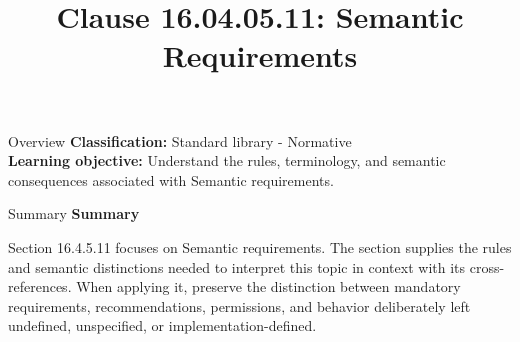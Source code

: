 \documentclass[10pt,letterpaper]{article}
\title{Clause 16.04.05.11: Semantic Requirements}
\author{}
\date{}
\begin{document}
\maketitle
\begin{CornellOverviewBox}{Overview}
\textbf{Classification:} Standard library - Normative\\[2pt]
\textbf{Learning objective:} Understand the rules, terminology, and semantic consequences associated with Semantic requirements.
\end{CornellOverviewBox}\begin{CornellSummaryBox}{Summary}
{\sffamily\bfseries\color{Accent} Summary}\par\vspace{3pt}Section 16.4.5.11 focuses on Semantic requirements. The section supplies the rules and semantic distinctions needed to interpret this topic in context with its cross-references. When applying it, preserve the distinction between mandatory requirements, recommendations, permissions, and behavior deliberately left undefined, unspecified, or implementation-defined.
\end{CornellSummaryBox}
\end{document}
